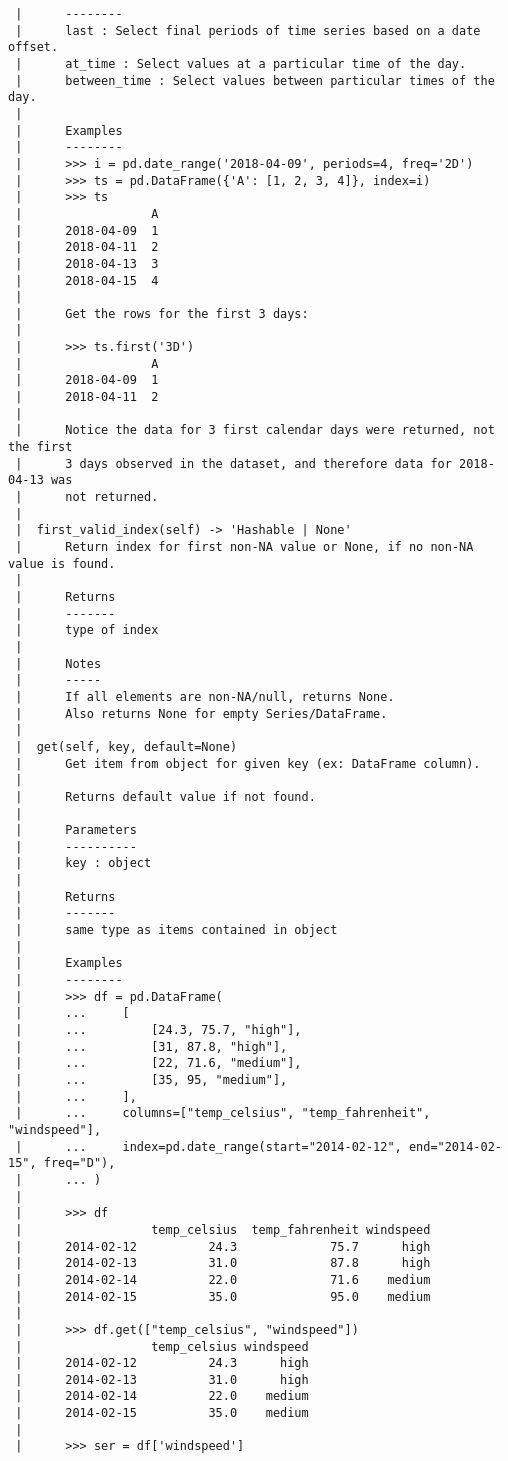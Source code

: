 \documentclass[
  letterpaper,
  DIV=11,
  numbers=noendperiod]{scrreprt}
\begin{document}
\begin{verbatim}
 |      --------
 |      last : Select final periods of time series based on a date offset.
 |      at_time : Select values at a particular time of the day.
 |      between_time : Select values between particular times of the day.
 |      
 |      Examples
 |      --------
 |      >>> i = pd.date_range('2018-04-09', periods=4, freq='2D')
 |      >>> ts = pd.DataFrame({'A': [1, 2, 3, 4]}, index=i)
 |      >>> ts
 |                  A
 |      2018-04-09  1
 |      2018-04-11  2
 |      2018-04-13  3
 |      2018-04-15  4
 |      
 |      Get the rows for the first 3 days:
 |      
 |      >>> ts.first('3D')
 |                  A
 |      2018-04-09  1
 |      2018-04-11  2
 |      
 |      Notice the data for 3 first calendar days were returned, not the first
 |      3 days observed in the dataset, and therefore data for 2018-04-13 was
 |      not returned.
 |  
 |  first_valid_index(self) -> 'Hashable | None'
 |      Return index for first non-NA value or None, if no non-NA value is found.
 |      
 |      Returns
 |      -------
 |      type of index
 |      
 |      Notes
 |      -----
 |      If all elements are non-NA/null, returns None.
 |      Also returns None for empty Series/DataFrame.
 |  
 |  get(self, key, default=None)
 |      Get item from object for given key (ex: DataFrame column).
 |      
 |      Returns default value if not found.
 |      
 |      Parameters
 |      ----------
 |      key : object
 |      
 |      Returns
 |      -------
 |      same type as items contained in object
 |      
 |      Examples
 |      --------
 |      >>> df = pd.DataFrame(
 |      ...     [
 |      ...         [24.3, 75.7, "high"],
 |      ...         [31, 87.8, "high"],
 |      ...         [22, 71.6, "medium"],
 |      ...         [35, 95, "medium"],
 |      ...     ],
 |      ...     columns=["temp_celsius", "temp_fahrenheit", "windspeed"],
 |      ...     index=pd.date_range(start="2014-02-12", end="2014-02-15", freq="D"),
 |      ... )
 |      
 |      >>> df
 |                  temp_celsius  temp_fahrenheit windspeed
 |      2014-02-12          24.3             75.7      high
 |      2014-02-13          31.0             87.8      high
 |      2014-02-14          22.0             71.6    medium
 |      2014-02-15          35.0             95.0    medium
 |      
 |      >>> df.get(["temp_celsius", "windspeed"])
 |                  temp_celsius windspeed
 |      2014-02-12          24.3      high
 |      2014-02-13          31.0      high
 |      2014-02-14          22.0    medium
 |      2014-02-15          35.0    medium
 |      
 |      >>> ser = df['windspeed']

\end{verbatim}
\end{document}
